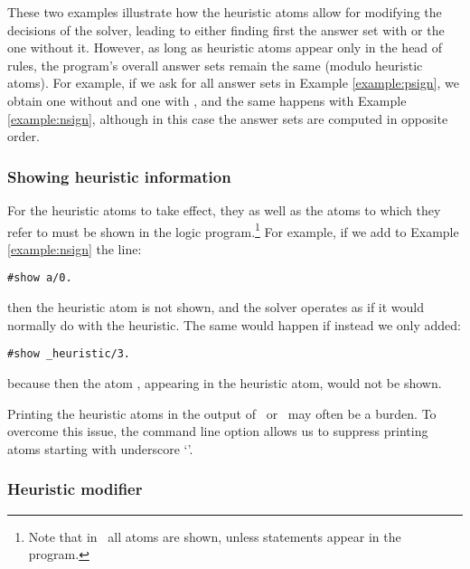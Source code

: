 These two examples illustrate how the heuristic atoms allow for modifying the decisions of the solver,
leading to either finding first the answer set with  or the one without it.
However, as long as heuristic atoms appear only in the head of rules,
the program's overall answer sets remain the same (modulo heuristic atoms).
For example, if we ask for all answer sets in Example \ref{example:psign},
we obtain one without  and one with ,
and the same happens with Example \ref{example:nsign}, 
although in this case the answer sets are computed in opposite order.

\subsubsection{Showing heuristic information}

For the heuristic atoms to take effect, they as well as the atoms to which they refer to
must be shown in the logic program.\footnote{Note that in \gringo\ all atoms are shown, 
  unless  statements appear in the program.}
For example, if we add to Example \ref{example:nsign} the line:
\begin{lstlisting}[numbers=none]
#show a/0.
\end{lstlisting}
then the heuristic atom is not shown, 
and the solver operates as if it would normally do with the  heuristic. 
The same would happen if instead we only added:
\begin{lstlisting}[numbers=none]
#show _heuristic/3.
\end{lstlisting}
because then the atom , appearing in the heuristic atom, would not be shown.

\begin{note}
Printing the heuristic atoms in the output of \clingo\ or \clasp\ may often be a burden.
To overcome this issue,
the command line option  allows us to suppress printing atoms starting with underscore `\code{\_}'.
\end{note}

\subsubsection{Heuristic modifier }

